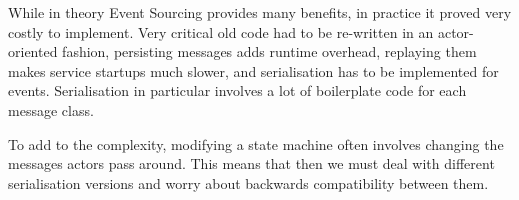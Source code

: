 \documentclass[conference]{IEEEtran}
\begin{document}
    While in theory Event Sourcing provides many benefits, in practice it proved very costly to
    implement.
    Very critical old code had to be re-written in an actor-oriented fashion, persisting messages
    adds runtime overhead, replaying them makes service startups much slower, and serialisation has
    to be implemented for events.
    Serialisation in particular involves a lot of boilerplate code for each message class.

    To add to the complexity, modifying a state machine often involves changing the messages actors
    pass around.
    This means that then we must deal with different serialisation versions and worry about
    backwards compatibility between them.


    \printbibliography
\end{document}
